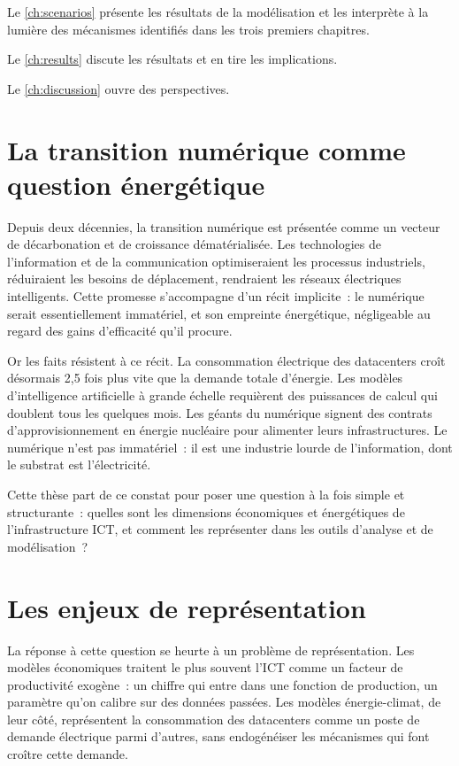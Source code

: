 Le \autoref{ch:scenarios} présente les résultats de la modélisation et les interprète à la lumière des mécanismes identifiés dans les trois premiers chapitres.

Le \autoref{ch:results} discute les résultats et en tire les implications.

Le \autoref{ch:discussion} ouvre des perspectives.

\section*{La transition numérique comme question énergétique}

Depuis deux décennies, la transition numérique est présentée comme un vecteur de décarbonation et de croissance dématérialisée. Les technologies de l'information et de la communication optimiseraient les processus industriels, réduiraient les besoins de déplacement, rendraient les réseaux électriques intelligents. Cette promesse s'accompagne d'un récit implicite~: le numérique serait essentiellement immatériel, et son empreinte énergétique, négligeable au regard des gains d'efficacité qu'il procure.

Or les faits résistent à ce récit. La consommation électrique des datacenters croît désormais 2,5 fois plus vite que la demande totale d'énergie. Les modèles d'intelligence artificielle à grande échelle requièrent des puissances de calcul qui doublent tous les quelques mois. Les géants du numérique signent des contrats d'approvisionnement en énergie nucléaire pour alimenter leurs infrastructures. Le numérique n'est pas immatériel~: il est une industrie lourde de l'information, dont le substrat est l'électricité.

Cette thèse part de ce constat pour poser une question à la fois simple et structurante~: quelles sont les dimensions économiques et énergétiques de l'infrastructure ICT, et comment les représenter dans les outils d'analyse et de modélisation~?

\section*{Les enjeux de représentation}

La réponse à cette question se heurte à un problème de représentation. Les modèles économiques traitent le plus souvent l'ICT comme un facteur de productivité exogène~: un chiffre qui entre dans une fonction de production, un paramètre qu'on calibre sur des données passées. Les modèles énergie-climat, de leur côté, représentent la consommation des datacenters comme un poste de demande électrique parmi d'autres, sans endogénéiser les mécanismes qui font croître cette demande.

